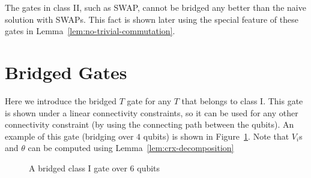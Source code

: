 The gates in class II, such as SWAP, cannot be bridged any better than the naive solution with SWAPs. This fact is shown later using the special feature of these gates in Lemma~\ref{lem:no-trivial-commutation}. 
\section{Bridged Gates}

Here we introduce the bridged $T$ gate for any $T$ that belongs to class I. This gate is shown under a linear connectivity constraints, so it can be used for any other connectivity constraint (by using the connecting path between the qubits). An example of this gate (bridging over $4$ qubits) is shown in Figure~\ref{fig:bridged-class-i}. Note that $V_i$s and $\theta$ can be computed using Lemma~\ref{lem:crx-decomposition}

\begin{figure}[ht]
  \label{fig:bridged-class-i}
  \centering
  \caption{A bridged class I gate over 6 qubits}
\end{figure}
  
